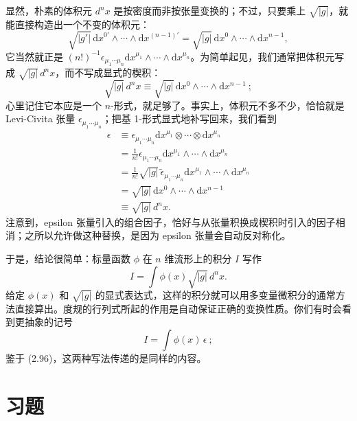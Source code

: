 显然，朴素的体积元 $d^{n}x$ 是按密度而非按张量变换的；不过，只要乘上 $\sqrt{|g|}$，就能直接构造出一个不变的体积元：
\begin{equation*}
\sqrt{|g'|}\,\mathrm{d}x^{0'}\wedge\cdots\wedge\mathrm{d}x^{(n-1)'}=\sqrt{|g|}\,\mathrm{d}x^{0}\wedge\cdots\wedge\mathrm{d}x^{n-1}, \tag{2.94}
\end{equation*}
它当然就正是 $(n!)^{-1}\epsilon_{\mu_{1}\cdots\mu_{n}}\mathrm{d}x^{\mu_{1}}\wedge\cdots\wedge\mathrm{d}x^{\mu_{n}}$。为简单起见，我们通常把体积元写成 $\sqrt{|g|}\,d^{n}x$，而不写成显式的楔积：
\begin{equation*}
\sqrt{|g|}\,d^{n}x\equiv\sqrt{|g|}\,\mathrm{d}x^{0}\wedge\cdots\wedge\mathrm{d}x^{n-1}\ ; \tag{2.95}
\end{equation*}
心里记住它本应是一个 $n$-形式，就足够了。事实上，体积元不多不少，恰恰就是 Levi-Civita 张量 $\epsilon_{\mu_{1}\cdots\mu_{n}}$；把基 1-形式显式地补写回来，我们看到
\begin{align*}
\epsilon&\equiv\epsilon_{\mu_{1}\cdots\mu_{n}}\mathrm{d}x^{\mu_{1}}\otimes\cdots\otimes\mathrm{d}x^{\mu_{n}}\\
&=\frac{1}{n!}\epsilon_{\mu_{1}\cdots\mu_{n}}\mathrm{d}x^{\mu_{1}}\wedge\cdots\wedge\mathrm{d}x^{\mu_{n}}\\
&=\frac{1}{n!}\sqrt{|g|}\,\tilde{\epsilon}_{\mu_{1}\cdots\mu_{n}}\mathrm{d}x^{\mu_{1}}\wedge\cdots\wedge\mathrm{d}x^{\mu_{n}}\\
&=\sqrt{|g|}\,\mathrm{d}x^{0}\wedge\cdots\wedge\mathrm{d}x^{n-1}\\
&\equiv\sqrt{|g|}\,d^{n}x. \tag{2.96}
\end{align*}
注意到，epsilon 张量引入的组合因子，恰好与从张量积换成楔积时引入的因子相消；之所以允许做这种替换，是因为 epsilon 张量会自动反对称化。

于是，结论很简单：标量函数 $\phi$ 在 $n$ 维流形上的积分 $I$ 写作
\begin{equation*}
\boxed{I=\int\phi(x)\sqrt{|g|}\,d^{n}x.} \tag{2.97}
\end{equation*}
给定 $\phi(x)$ 和 $\sqrt{|g|}$ 的显式表达式，这样的积分就可以用多变量微积分的通常方法直接算出。度规的行列式所起的作用是自动保证正确的变换性质。你们有时会看到更抽象的记号
\begin{equation*}
I=\int\phi(x)\,\epsilon\ ; \tag{2.98}
\end{equation*}
鉴于 (2.96)，这两种写法传递的是同样的内容。

\section{习题}

